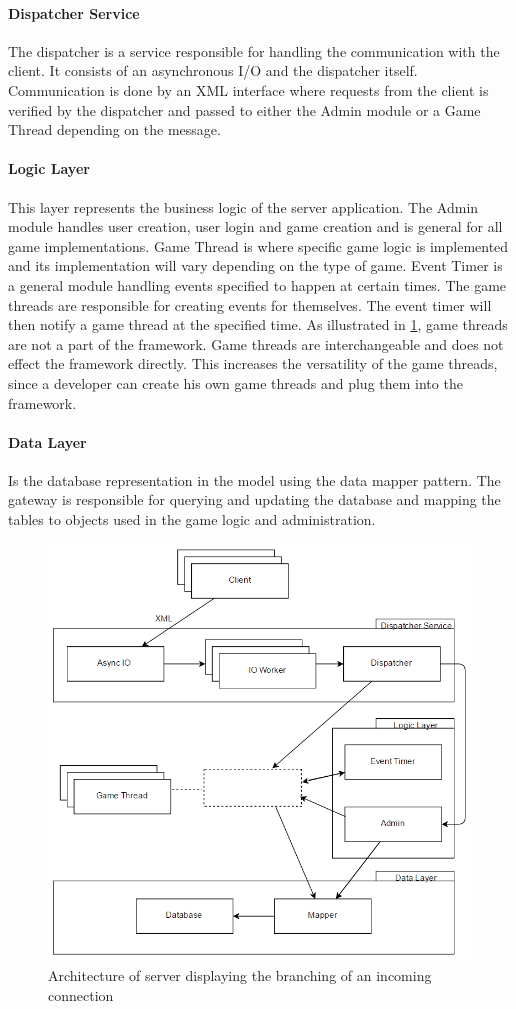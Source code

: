 \paragraph{Dispatcher Service}
The dispatcher is a service responsible for handling the communication with the client. It consists of an asynchronous I/O and the dispatcher itself. Communication is done by an XML interface where requests from the client is verified by the dispatcher and passed to either the Admin module or a Game Thread depending on the message. 

\paragraph{Logic Layer}
This layer represents the business logic of the server application. The Admin module handles user creation, user login and game creation and is general for all game implementations. Game Thread is where specific game logic is implemented and its implementation will vary depending on the type of game. Event Timer is a general module handling events specified to happen at certain times. The game threads are responsible for creating events for themselves. The event timer will then notify a game thread at the specified time. As illustrated in \cref{fig:serverarch}, game threads are not a part of the framework. Game threads are interchangeable and does not effect the framework directly. This increases the versatility of the game threads, since a developer can create his own game threads and plug them into the framework.

\paragraph{Data Layer}
Is the database representation in the model using the data mapper pattern. The gateway is responsible for querying and updating the database and mapping the tables to objects used in the game logic and administration.

\begin{figure}[H]
  \centering
  \includegraphics[width=\textwidth]{billeder/serverarch.png}  
  \caption{Architecture of server displaying the branching of an incoming connection}
  \label{fig:serverarch}
\end{figure}